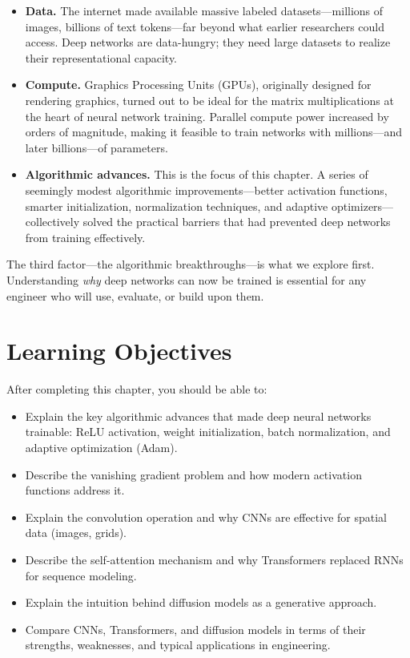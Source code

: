 \documentclass[12pt]{article}
\begin{document}
\begin{itemize}
    \item \textbf{Data.} The internet made available massive labeled datasets---millions of images, billions of text tokens---far beyond what earlier researchers could access. Deep networks are data-hungry; they need large datasets to realize their representational capacity.
    
    \item \textbf{Compute.} Graphics Processing Units (GPUs), originally designed for rendering graphics, turned out to be ideal for the matrix multiplications at the heart of neural network training. Parallel compute power increased by orders of magnitude, making it feasible to train networks with millions---and later billions---of parameters.
    
    \item \textbf{Algorithmic advances.} This is the focus of this chapter. A series of seemingly modest algorithmic improvements---better activation functions, smarter initialization, normalization techniques, and adaptive optimizers---collectively solved the practical barriers that had prevented deep networks from training effectively.
\end{itemize}

The third factor---the algorithmic breakthroughs---is what we explore first. Understanding \textit{why} deep networks can now be trained is essential for any engineer who will use, evaluate, or build upon them.

\section*{Learning Objectives}
After completing this chapter, you should be able to:
\begin{itemize}
    \item Explain the key algorithmic advances that made deep neural networks trainable: ReLU activation, weight initialization, batch normalization, and adaptive optimization (Adam).
    \item Describe the vanishing gradient problem and how modern activation functions address it.
    \item Explain the convolution operation and why CNNs are effective for spatial data (images, grids).
    \item Describe the self-attention mechanism and why Transformers replaced RNNs for sequence modeling.
    \item Explain the intuition behind diffusion models as a generative approach.
    \item Compare CNNs, Transformers, and diffusion models in terms of their strengths, weaknesses, and typical applications in engineering.
\end{itemize}
\end{document}

